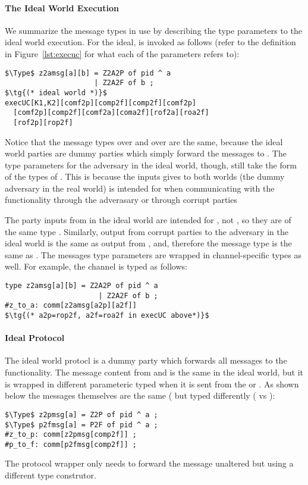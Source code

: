 \paragraph{The Ideal World Execution}
We summarize the message types in use by describing the type parameters to the ideal world execution.
For the ideal,  is invoked as follows (refer to the  definition in Figure~\ref{lst:execuc} for what each of the parameters refers to):
\begin{lstlisting}[basicstyle=\small\BeraMonottFamily, frame=single, mathescape]
$\Type$ z2amsg[a][b] = Z2A2P of pid ^ a 
                     | Z2A2F of b ;
$\tg{(* ideal world *)}$
execUC[K1,K2][comf2p][comp2f][comp2f][comf2p]
  [comf2p][comp2f][comf2a][coma2f][rof2a][roa2f]
  [rof2p][rop2f]
\end{lstlisting}
Notice that the message types over  and over  are the same, because the ideal world parties are dummy parties which simply forward the messages to \Fcom.
The type parameters for the adversary in the ideal world, though, still take the form of the types of \Fro.
This is because the inputs \Z gives to both worlds (the dummy adversary in the real world) is intended for \Fro when communicating with the functionality through the adverasary or through corrupt parties 

The party inputs from  in the ideal world are intended for \Fcom, not \Fro, so they are of the same type .
Similarly, output from corrupt parties to the adversary in the ideal world is the same as output from \Fcom, and, therefore the message type is the same as .
The messages type parameters are wrapped in channel-specific types as well.
For example, the channel  is typed as follows:
\begin{lstlisting}[basicstyle=\small\BeraMonottFamily, frame=single, mathescape]
type z2amsg[a][b] = Z2A2P of pid ^ a
                      | Z2A2F of b ;
#z_to_a: comm[z2amsg[a2p][a2f]]
$\tg{(* a2p=rop2f, a2f=roa2f in execUC above*)}$
\end{lstlisting}

\paragraph{Ideal Protocol}
The ideal world protocl is a dummy party which forwards all messages to the functionality. 
The message content from  and  is the same in the ideal world, but it is wrapped in different parameteric typed when it is sent from the  or .
As shown below the messages themselves are the same ( but typed differently ( vs ):
\begin{lstlisting}[basicstyle=\small\BeraMonottFamily, frame=single, mathescape]
$\Type$ z2pmsg[a] = Z2P of pid ^ a ;
$\Type$ p2fmsg[a] = P2F of pid ^ a ;
#z_to_p: comm[z2pmsg[comp2f]] ;
#p_to_f: comm[p2fmsg[comp2f]] ;
\end{lstlisting}
The protocol wrapper only needs to forward the message unaltered but using a different type construtor. 

